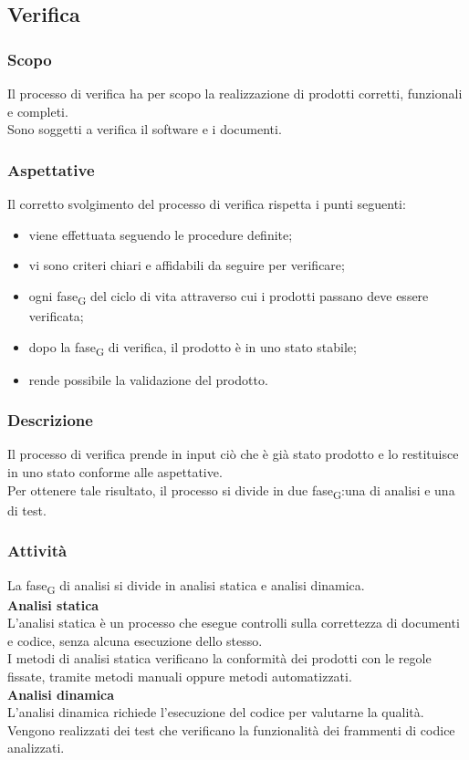 \subsection{Verifica}
    \label{verifica}
    \subsubsection{Scopo}
    Il processo di verifica ha per scopo la realizzazione di prodotti corretti, funzionali e completi.\\Sono soggetti a verifica il software e i documenti.
    \subsubsection{Aspettative}
    Il corretto svolgimento del processo di verifica rispetta i punti seguenti:
    \begin{itemize}
    	\item viene effettuata seguendo le procedure definite;
    	\item vi sono criteri chiari e affidabili da seguire per verificare;
    	\item ogni fase\textsubscript{G} del ciclo di vita attraverso cui i prodotti passano deve essere verificata;
    	\item dopo la fase\textsubscript{G} di  verifica, il prodotto è in uno stato stabile;
    	\item rende possibile la validazione del prodotto.
    \end{itemize}
    \subsubsection{Descrizione}
    Il processo di verifica prende in input ciò che è già stato prodotto e lo restituisce in uno stato conforme alle aspettative.\\Per ottenere tale risultato, il processo si divide in due fase\textsubscript{G}:una di analisi e una di test.
    \subsubsection{Attività}
    La fase\textsubscript{G} di analisi si divide in analisi statica e analisi dinamica.\\
    \textbf{Analisi statica}\\
    L'analisi statica è un processo che esegue controlli sulla correttezza di documenti e codice, senza alcuna esecuzione dello stesso.\\I metodi di analisi statica verificano la conformità dei prodotti con le regole fissate, tramite metodi manuali oppure metodi automatizzati.\\
    \textbf{Analisi dinamica}\\
    L'analisi dinamica richiede l'esecuzione del codice per valutarne la qualità.\\Vengono realizzati dei test  che verificano la funzionalità dei frammenti di codice analizzati.

